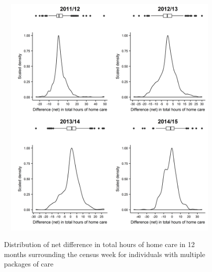 \documentclass[]{article}
\begin{document}
\begin{figure}[]
  \centering
    \caption{Distribution of net difference in total hours of home care in 12 months surrounding the census week for individuals with multiple packages of care}
    \includegraphics[height = 12cm, width = 16cm]{figures/chapter-renf/16-census-multiples-netdiff.png}
    \label{fig:renf-multiple-cen-netdiff}
\end{figure}

\begin{table}[h]
\centering
\caption{Summary statistics of net difference in total hours of homecare in 12 months surrounding the census week for individuals with multiple packages of care}
\label{tab:renf-multi-cen-netdiff}
\end{table}
\end{document}
